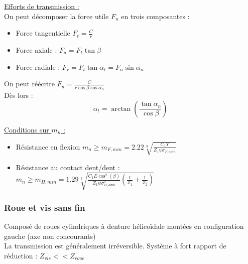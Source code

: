 \documentclass[../main.tex]{subfiles}
\begin{document}
\quad \underline{Efforts de transmission :}\\
On peut décomposer la force utile $F_n$ en trois composantes :\begin{itemize}
    \item Force tangentielle $F_t = \frac{C}{r}$\\
    \item Force axiale : $F_a = F_t \tan{\beta}$\\
    \item Force radiale : $F_r = F_t \tan{\alpha_t} = F_n \sin{\alpha_n}$
\end{itemize}

On peut réécrire $F_n = \frac{C}{r\cos{\beta}\cos{\alpha_n}}$\\
Dès lors : \begin{equation}
    \alpha_t = \arctan(\frac{\tan{\alpha_n}}{\cos{\beta}})
\end{equation}


\quad \underline{Conditions sur $m_n$ :}\\
\begin{itemize}
    \item Résistance en flexion $m_n\geq m_{F,min} = 2.22\sqrt[3]{\frac{C_1 Y}{Z_1 \psi \sigma_{F,adm}}}$\\
    \item Résistance au contact dent/dent : $m_n\geq m_{H,min} = 1.29 \sqrt[3]{\frac{C_1 E \cos^2(\beta)}{Z_1 \psi \sigma_{H,adm}^2} (\frac{1}{Z_1}+\frac{1}{Z_2})}$\\
\end{itemize}

\subsubsection{Roue et vis sans fin}
Composé de roues cylindriques à denture hélicoïdale montées en configuration gauche (axe non concourants)\\
La transmission est généralement irréversible. Système à fort rapport de réduction : $Z_{vis}<< Z_{roue}$\\
\end{document}
